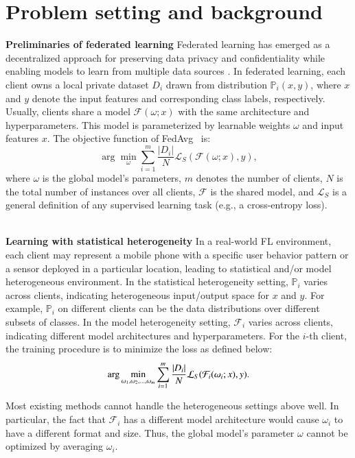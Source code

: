 \section{Problem setting and background}
\textbf{Preliminaries of federated learning}
 Federated learning  has emerged as a decentralized approach for preserving data privacy and confidentiality while enabling models to learn from multiple data sources \cite{zhang2021subgraph}.
 In federated learning, each client owns a local private dataset ${D}_i$ drawn from distribution $\mathbb{P}_i(x,y)$, where $x$ and $y$ denote the input features and corresponding class labels, respectively. Usually, clients share a model $\mathcal{F}(\omega;x)$ with the same architecture and hyperparameters. This model is parameterized by learnable weights $\omega$ and input features $x$. The objective function of FedAvg~\cite{mcmahan2017communication} is:
\begin{equation} \label{eq:sl-lossw}
\arg\min_{\omega} \sum_{i=1}^{m} \frac{|D_i|}{N} \mathcal{L}_S(\mathcal{F}(\omega; x), y),
\end{equation}
\noindent where $\omega$ is the global model's parameters, $m$ denotes the number of clients, $N$ is the total number of instances over all clients, $\mathcal{F}$ is the shared model, and $\mathcal{L}_S$ is a general definition of any supervised learning task (e.g., a cross-entropy loss).

\\\textbf{ Learning with statistical heterogeneity}
In a real-world FL environment, each client may represent a mobile phone with a specific user behavior pattern or a sensor deployed in a particular location, leading to statistical and/or model heterogeneous environment. In the statistical heterogeneity setting, $\mathbb{P}_i$ varies across clients, indicating heterogeneous input/output space for $x$ and $y$. For example, $\mathbb{P}_i$ on different clients can be the data distributions over different subsets of classes. In the model heterogeneity setting, $\mathcal{F}_i$ varies across clients, indicating different model architectures and hyperparameters. For the $i$-th client, the training procedure is to minimize the loss as defined below:
\begin{equation} \label{eq:fed-sp-loss}
\small
\arg\min_{\omega_1,\omega_2,\dots,\omega_m} \sum_{i=1}^{m} \frac{|D_i|}{N} \mathcal{L}_S(\mathcal{F}_i(\omega_i; x), y).
\end{equation}


Most existing methods cannot handle the heterogeneous settings above well. In particular, the fact that $\mathcal{F}_i$ has a different model architecture would cause $\omega_i$ to have a different format and size. Thus, the global model's parameter $\omega$ cannot be optimized by averaging $\omega_i$. 

